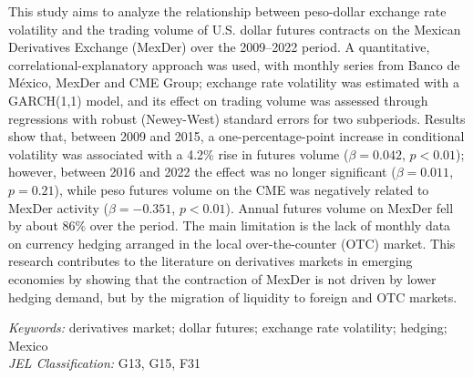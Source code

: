 This study aims to analyze the relationship between peso-dollar exchange rate volatility and the trading volume of U.S. dollar futures contracts on the Mexican Derivatives Exchange (MexDer) over the 2009–2022 period. A quantitative, correlational-explanatory approach was used, with monthly series from Banco de México, MexDer and CME Group; exchange rate volatility was estimated with a GARCH(1,1) model, and its effect on trading volume was assessed through regressions with robust (Newey-West) standard errors for two subperiods. Results show that, between 2009 and 2015, a one-percentage-point increase in conditional volatility was associated with a 4.2\% rise in futures volume ($\beta = 0.042$, $p < 0.01$); however, between 2016 and 2022 the effect was no longer significant ($\beta = 0.011$, $p = 0.21$), while peso futures volume on the CME was negatively related to MexDer activity ($\beta = -0.351$, $p < 0.01$). Annual futures volume on MexDer fell by about 86\% over the period. The main limitation is the lack of monthly data on currency hedging arranged in the local over-the-counter (OTC) market. This research contributes to the literature on derivatives markets in emerging economies by showing that the contraction of MexDer is not driven by lower hedging demand, but by the migration of liquidity to foreign and OTC markets.

\hspace{1.27cm}\textit{Keywords:} derivatives market; dollar futures; exchange rate volatility; hedging; Mexico\\
\hspace*{1.27cm}\textit{JEL Classification:} G13, G15, F31
